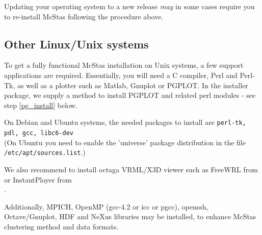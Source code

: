 Updating your operating system to a new release \emph{may} in some cases require you to re-install McStas following the procedure above. 

\subsection{Other Linux/Unix systems}
To get a fully functional McStas installation on Unix systems, a few support
applications are required. Essentially, you will need a C compiler,
Perl and Perl-Tk, as well as a plotter such as Matlab, Gnuplot or
PGPLOT. In the installer package, we supply a method to install PGPLOT
and related perl modules - see step \ref{pg_install} below.

\noindent On Debian and Ubuntu systems, the
needed packages to install are \texttt{perl-tk, pdl, gcc,
  libc6-dev} \\(On Ubuntu you need to enable the 'universe' package
distribution in the file \\\verb+/etc/apt/sources.list+.)

\noindent We also recommend to install octaga VRML/X3D viewer such as
FreeWRL from \\ or 
InstantPlayer from \\.

\noindent Additionally, MPICH, OpenMP (gcc-4.2 or icc or pgcc), openssh, Octave/Gnuplot, HDF and NeXus libraries may be installed, to enhance McStas clustering method and data formats.

